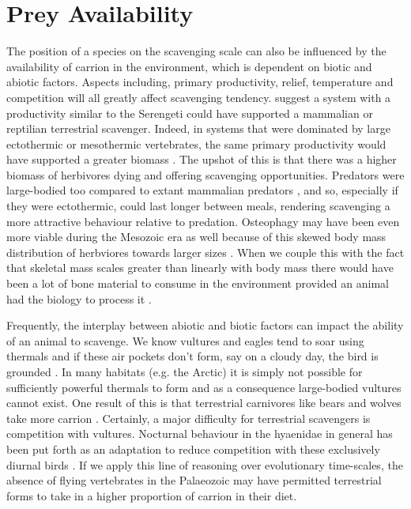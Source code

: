 \documentclass[a4paper,12pt]{article}
\begin{document}
\section*{Prey Availability}
The position of a species on the scavenging scale can also be influenced by the availability of carrion in the environment, which is dependent on biotic and abiotic factors. %
Aspects including, primary productivity, relief, temperature and competition will all greatly affect scavenging tendency. 
\cite{ruxton2004obligate} suggest a system with a productivity similar to the Serengeti could have supported a mammalian or reptilian terrestrial scavenger.
Indeed, in systems that were dominated by large ectothermic or mesothermic vertebrates, the same primary productivity would have supported a greater biomass \citep{mcnab2009resources}.
The upshot of this is that there was a higher biomass of herbivores dying and offering scavenging opportunities.
Predators were large-bodied too compared to extant mammalian predators \citep{mcnab2009resources}, and so, especially if they were ectothermic, could last longer between meals, rendering scavenging a more attractive behaviour relative to predation.
Osteophagy may have been even more viable during the Mesozoic era as well because of this skewed body mass distribution of herbviores towards larger sizes \citep{10.1371/journal.pone.0051925}.
When we couple this with the fact that skeletal mass scales greater than linearly with body mass \citep{prange1979scaling} there would have been a lot of bone material to consume in the environment provided an animal had the biology to process it \citep{chure1997one}.

Frequently, the interplay between abiotic and biotic factors can impact the ability of an animal to scavenge. 
We know vultures and eagles tend to soar using thermals and if these air pockets don't form, say on a cloudy day, the bird is grounded \citep{mundy1992vultures}.
In many habitats (e.g. the Arctic) it is simply not possible for sufficiently powerful thermals to form and as a consequence large-bodied vultures cannot exist.
One result of this is that terrestrial carnivores like bears and wolves take more carrion \citep{devault2003scavenging}.
Certainly, a major difficulty for terrestrial scavengers is competition with vultures.
Nocturnal behaviour in the hyaenidae in general has been put forth as an adaptation to reduce competition with these exclusively diurnal birds \citep{gittleman2013carnivore}.
If we apply this line of reasoning over evolutionary time-scales, the absence of flying vertebrates in the Palaeozoic may have permitted terrestrial forms to take in a higher proportion of carrion in their diet.
\end{document}
